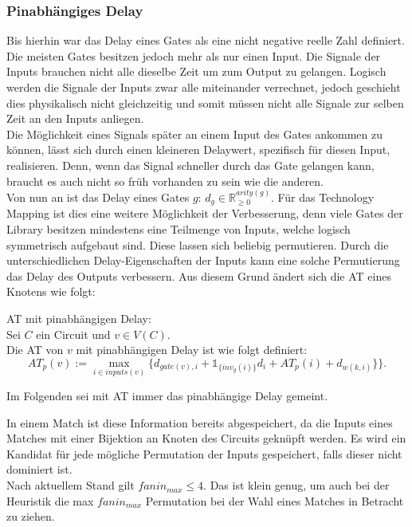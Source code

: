 \documentclass[11pt, a4paper, german]{article}
\newcommand{\TM}{Technology  Mapping }
\begin{document}
\subsubsection{Pinabhängiges Delay}
\label{subsec:pinabh_delay}
Bis hierhin war das Delay eines Gates als eine nicht negative reelle Zahl definiert. Die meisten Gates besitzen jedoch mehr als nur einen Input. Die Signale der Inputs brauchen nicht alle dieselbe Zeit um zum Output zu gelangen. Logisch werden die Signale der Inputs zwar alle miteinander verrechnet, jedoch geschieht dies physikalisch nicht gleichzeitig und somit müssen nicht alle Signale zur selben Zeit an den Inputs anliegen.\\
Die Möglichkeit eines Signals später an einem Input des Gates ankommen zu können, lässt sich durch einen kleineren Delaywert, spezifisch für diesen Input, realisieren. Denn, wenn das Signal schneller durch das Gate gelangen kann, braucht es auch nicht so früh vorhanden zu sein wie die anderen. \\
Von nun an ist das Delay eines Gates $g$: $d_g \in \mathbb{R}_{\geq 0}^{arity(g)}$. Für das \TM ist dies eine weitere Möglichkeit der Verbesserung, denn viele Gates der Library besitzen mindestens eine Teilmenge von Inputs, welche logisch symmetrisch aufgebaut sind. Diese lassen sich beliebig permutieren. Durch die unterschiedlichen Delay-Eigenschaften der Inputs kann eine solche Permutierung das Delay des Outputs verbessern. Aus diesem Grund ändert sich die AT eines Knotens wie folgt: 
\begin{definition}{AT mit pinabhängigen Delay:}\\
	Sei $C$ ein Circuit und $v \in V(C)$.\\
	Die AT von $v$ mit pinabhängigen Delay ist wie folgt definiert: \[ AT_p(v) :=  \max\limits_{i \in inputs(v)} \{   d_{gate(v),i} + \mathbb{1}_{\{inv_g(i) \}} d_{i} + AT_p(i) + d_{w(k,i)} \}   \}.\]
\end{definition}
Im Folgenden sei mit AT immer das pinabhängige Delay gemeint.

In einem Match ist diese Information bereits abgespeichert, da die Inputs eines Matches mit einer Bijektion an Knoten des Circuits geknüpft werden. Es wird ein  Kandidat für jede mögliche Permutation der Inputs gespeichert, falls dieser nicht dominiert ist.\\
Nach aktuellem Stand gilt $fanin_{max} \leq 4$. Das ist klein genug, um auch bei der Heuristik die max $fanin_{max}$ Permutation bei der Wahl eines Matches in Betracht zu ziehen. 
\end{document}

